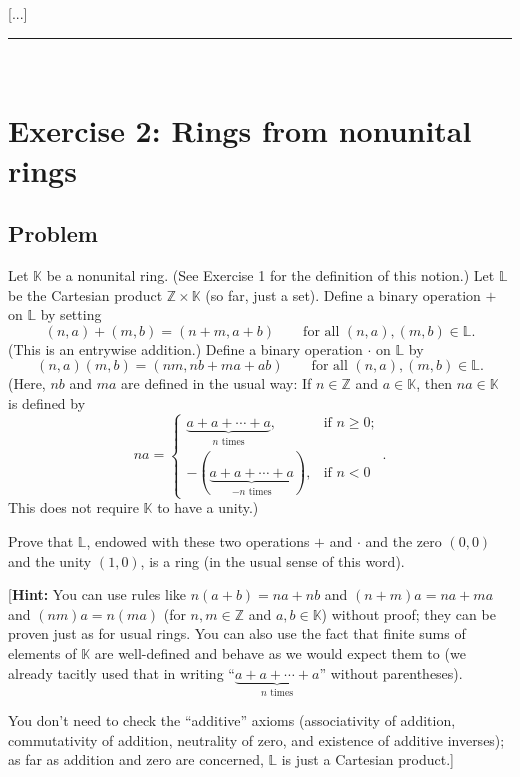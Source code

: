 \documentclass[paper=a4, fontsize=12pt]{scrartcl} %
\newcommand{\KK}{\mathbb{K}} %
\newcommand{\LL}{\mathbb{L}} %
\newcommand{\ZZ}{\mathbb{Z}} %
\newcommand{\tup}[1]{\left( #1 \right)}
\newcommand{\horrule}[1]{\rule{\linewidth}{#1}} %
\theoremstyle{plainsl}
\theoremstyle{definition}
\theoremstyle{remark}
\begin{document}
[...]

\horrule{0.3pt} \\[0.4cm]

\section{Exercise 2: Rings from nonunital rings}

\subsection{Problem}

Let $\KK$ be a nonunital ring.
(See Exercise 1 for the definition of this notion.)
Let $\LL$ be the Cartesian product $\ZZ \times \KK$ (so far, just a set).
Define a binary operation $+$ on $\LL$ by setting
\[
\tup{n, a} + \tup{m, b} = \tup{n+m, a+b}
\qquad
\text{for all } \tup{n, a}, \tup{m, b} \in \LL .
\]
(This is an entrywise addition.)
Define a binary operation $\cdot$ on $\LL$ by
\[
\tup{n, a} \tup{m, b} = \tup{nm, nb + ma + ab}
\qquad
\text{for all } \tup{n, a}, \tup{m, b} \in \LL .
\]
(Here, $nb$ and $ma$ are defined in the usual way:
If $n \in \ZZ$ and $a \in \KK$, then $na \in \KK$ is defined by
\[
na=
\begin{cases}
\underbrace{a+a+\cdots+a}_{n \text{ times}},           & \text{if } n \geq 0;\\
- \tup{\underbrace{a+a+\cdots+a}_{-n \text{ times}}} , & \text{if } n < 0
\end{cases}
.
\]
This does not require $\KK$ to have a unity.)

Prove that $\LL$, endowed with these two operations $+$ and $\cdot$ and
the zero $\tup{0, 0}$ and the unity $\tup{1, 0}$, is a ring
(in the usual sense of this word).

[\textbf{Hint:} You can use rules like $n \tup{a + b} = na + nb$ and
$\tup{n + m} a = na + ma$ and $\tup{nm} a = n \tup{ma}$
(for $n, m \in \ZZ$ and $a, b \in \KK$) without proof; they can be
proven just as for usual rings.
You can also use the fact that finite sums of elements of $\KK$ are
well-defined and behave as we would expect them to
(we already tacitly used that in writing
``$\underbrace{a+a+\cdots+a}_{n \text{ times}}$'' without parentheses).

You don't need to check the ``additive'' axioms (associativity of
addition, commutativity of addition, neutrality of zero, and
existence of additive inverses); as far as addition and zero are
concerned, $\LL$ is just a Cartesian product.]
\end{document}
